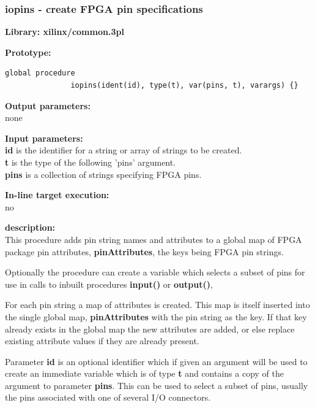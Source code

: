             

        \subsubsection{iopins - create FPGA pin specifications}\label{sec:lpiopins}
            
            {\bf Library: xilinx/common.3pl}

            {\bf Prototype:} \\
            \vsp
            \begin{lstlisting}[gobble=12, language=threepl]
               global procedure
               iopins(ident(id), type(t), var(pins, t), varargs) {}
            \end{lstlisting}

            {\bf Output parameters:} \\
            none

            {\bf Input parameters:} \\            
            {\bf id} is the identifier for a string or array of strings to be
            created.\\
            {\bf t} is the type of the following 'pins' argument.\\
            {\bf pins} is a collection of strings specifying FPGA pins.
        
            {\bf In-line target execution:} \\
            no

            {\bf description:} \\
            This procedure adds pin string names and attributes to a global map of
            FPGA package pin attributes, {\bf pinAttributes}, the keys being FPGA
            pin strings.
            
            Optionally the procedure can create a variable which selects a
            subset of pins for use in calls to inbuilt procedures {\bf input()}
            or {\bf output()},

            For each pin string a map of attributes is created. This map is itself
            inserted into the single global map, {\bf pinAttributes} with the pin
            string as the key. If that key already exists in the global map the new
            attributes are added, or else replace existing attribute values if they
            are already present.

            Parameter {\bf id} is an optional identifier which if given an argument
            will be used to create an immediate variable which is of type {\bf t}
            and contains a copy of the argument to parameter {\bf pins}. This can
            be used to select a subset of pins, usually the pins associated with
            one of several I/O connectors.

